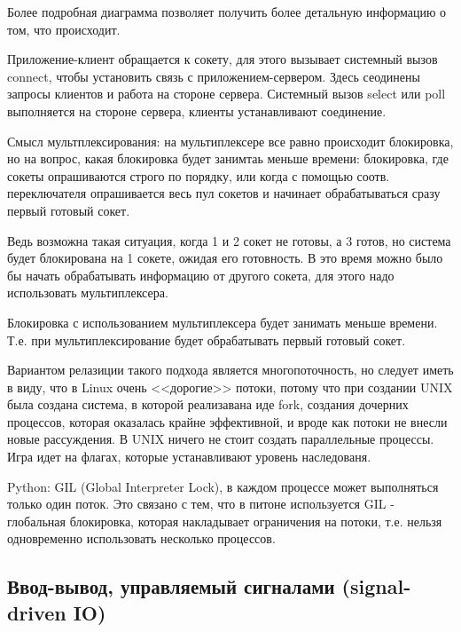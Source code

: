 \documentclass[12pt,a4paper]{scrreprt}
\begin{document}
Более подробная диаграмма позволяет получить более детальную информацию о том, что происходит.

Приложение-клиент обращается к сокету, для этого вызывает системный вызов connect, чтобы установить связь с приложением-сервером. Здесь сеодинены запросы клиентов и работа на стороне сервера. Системный вызов select или poll выполняется на стороне сервера, клиенты устанавливают соединение.

Смысл мультплексирования: на мультиплексере все равно происходит блокировка, но на вопрос, какая блокировка будет занимтаь меньше времени: блокировка, где сокеты опрашиваются строго по порядку, или когда с помощью соотв. переключателя опрашивается весь пул сокетов и начинает обрабатываться сразу первый готовый сокет. 

Ведь возможна такая ситуация, когда 1 и 2 сокет не готовы, а 3 готов, но система будет блокирована на 1 сокете, ожидая его готовность. В это время можно было бы начать обрабатывать информацию от другого сокета, для этого надо использовать мультиплексера.

Блокировка с использованием мультиплексера будет занимать меньше времени. Т.е. при мультиплексирование будет обрабатывать первый готовый сокет.

Вариантом релазиции такого подхода является многопоточность, но следует иметь в виду, что в Linux очень <<дорогие>> потоки, потому что при создании UNIX была создана система, в которой реализавана иде fork, создания дочерних процессов, которая оказалась крайне эффективной, и вроде как потоки не внесли новые рассуждения. В UNIX ничего не стоит создать параллельные процессы. Игра идет на флагах, которые устанавливают уровень наследованя. 

Python: GIL (Global Interpreter Lock), в каждом процессе может выполняться только один поток. Это связано с тем, что в питоне используется GIL - глобальная блокировка, которая накладывает ограничения на потоки, т.е. нельзя одновременно использовать несколько процессов.

\subsection*{Ввод-вывод, управляемый сигналами (signal-driven IO)}

\begin{figure}[!h]
\end{figure}
\end{document}
